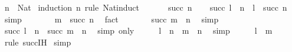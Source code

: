 \begin{isabellebody}
\isamarkupfalse%
\ {\isacartoucheopen}n\ {\isacharcolon}{\kern0pt}\ Nat{\isacartoucheclose}\isanewline
{}\isamarkupfalse%
\ {\isacharparenleft}{\kern0pt}induction\ n\ rule{\isacharcolon}{\kern0pt}\ Nat{\isacharunderscore}{\kern0pt}induct{\isacharparenright}{\kern0pt}\isanewline
\ \ \isanewline
\ \ \isamarkupfalse%
\ {\isacharparenleft}{\kern0pt}succ\ n{\isacharparenright}{\kern0pt}\isanewline
\ \ \isamarkupfalse%
\ {\isachardoublequoteopen}succ\ {\isacharparenleft}{\kern0pt}l\ {\isacharplus}{\kern0pt}\ n{\isacharparenright}{\kern0pt}\ {\isacharequal}{\kern0pt}\ l\ {\isacharplus}{\kern0pt}\ succ\ n{\isachardoublequoteclose}\ \isamarkupfalse%
\ simp\isanewline
\ \ \isamarkupfalse%
\ \isamarkupfalse%
\ {\isachardoublequoteopen}{\isachardot}{\kern0pt}{\isachardot}{\kern0pt}{\isachardot}{\kern0pt}\ {\isacharless}{\kern0pt}\ m\ {\isacharplus}{\kern0pt}\ succ\ n{\isachardoublequoteclose}\ \isamarkupfalse%
\ fact\isanewline
\ \ \isamarkupfalse%
\ \isamarkupfalse%
\ {\isachardoublequoteopen}{\isachardot}{\kern0pt}{\isachardot}{\kern0pt}{\isachardot}{\kern0pt}\ {\isacharequal}{\kern0pt}\ succ\ {\isacharparenleft}{\kern0pt}m\ {\isacharplus}{\kern0pt}\ n{\isacharparenright}{\kern0pt}{\isachardoublequoteclose}\ \isamarkupfalse%
\ simp\isanewline
\ \ \isanewline
\ \ \isamarkupfalse%
\ \isamarkupfalse%
\ {\isachardoublequoteopen}succ\ {\isacharparenleft}{\kern0pt}l\ {\isacharplus}{\kern0pt}\ n{\isacharparenright}{\kern0pt}\ {\isacharless}{\kern0pt}\ succ\ {\isacharparenleft}{\kern0pt}m\ {\isacharplus}{\kern0pt}\ n{\isacharparenright}{\kern0pt}{\isachardoublequoteclose}\ \isamarkupfalse%
\ {\isacharparenleft}{\kern0pt}simp\ only{\isacharcolon}{\kern0pt}{\isacharparenright}{\kern0pt}\isanewline
\ \ \isamarkupfalse%
\ \isamarkupfalse%
\ {\isachardoublequoteopen}l\ {\isacharplus}{\kern0pt}\ n\ {\isacharless}{\kern0pt}\ m\ {\isacharplus}{\kern0pt}\ n{\isachardoublequoteclose}\ \isamarkupfalse%
\ simp\isanewline
\ \ \isamarkupfalse%
\ \isamarkupfalse%
\ {\isachardoublequoteopen}l\ {\isacharless}{\kern0pt}\ m{\isachardoublequoteclose}\ \isamarkupfalse%
\ {\isacharparenleft}{\kern0pt}rule\ succ{\isachardot}{\kern0pt}IH{\isacharparenright}{\kern0pt}\isanewline
{}\isamarkupfalse%
\ simp%
\endisatagproof
{\isafoldproof}%
%
\isadelimproof

\end{isabellebody}
